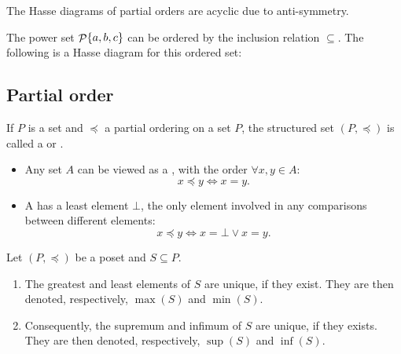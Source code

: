 The Hasse diagrams of partial orders are acyclic due to anti-symmetry.

\begin{example}
The power set $\mathop{\mathcal{P}}\{a,b,c\}$ can be ordered by the inclusion relation $\subseteq$. The following is a Hasse diagram for this ordered set:
\begin{center}
\end{center}
\end{example}

\subsection{Partial order}
\begin{definition}
If $P$ is a set and $\preceq$ a partial ordering on a set $P$, the structured set $(P,\preceq)$ is called a  or .
\end{definition}

\begin{example}
\begin{itemize}
\item Any set $A$ can be viewed as a , with the order $\forall x,y\in A$:
\[ x\preceq y \iff x=y. \]
\item A  has a least element $\bot$, the only element involved in any comparisons between different elements:
\[ x \preceq y \iff x=\bot \lor x = y. \]
\end{itemize}
\end{example}

\begin{lemma}
Let $(P,\preceq)$ be a poset and $S\subseteq P$.
\begin{enumerate}
\item The greatest and least elements of $S$ are unique, if they exist. They are then denoted, respectively, $\max(S)$ and $\min(S)$.
\item Consequently, the supremum and infimum of $S$ are unique, if they exists. They are then denoted, respectively, $\sup(S)$ and $\inf(S)$.
\end{enumerate}
\end{lemma}


